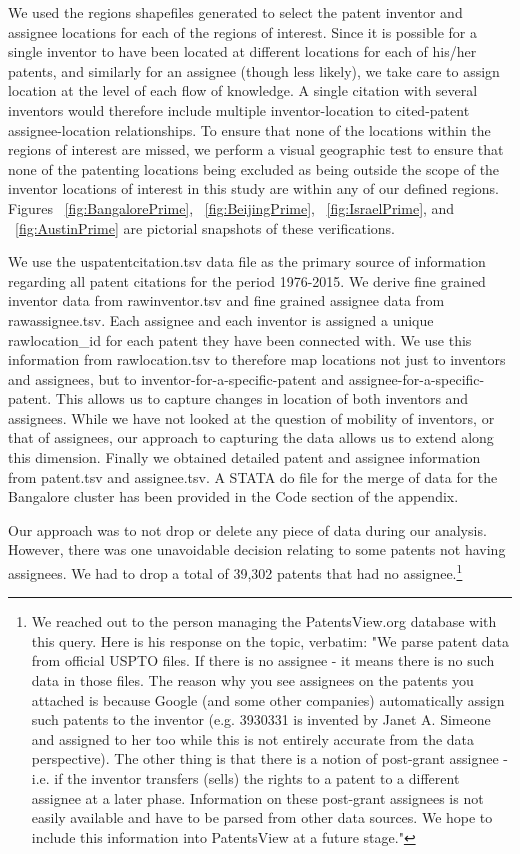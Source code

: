\documentclass[12pt]{article}
\begin{document}
We used the regions shapefiles generated to select the patent inventor and assignee locations for each of the regions of interest. Since it is possible for a single inventor to have been located at different locations for each of his/her patents, and similarly for an assignee (though less likely), we take care to assign location at the level of each flow of knowledge. A single citation with several inventors would therefore include multiple inventor-location to cited-patent assignee-location relationships. To ensure that none of the locations within the regions of interest are missed, we perform a visual geographic test to ensure that none of the patenting locations being excluded as being outside the scope of the inventor locations of interest in this study are within any of our defined regions. Figures ~\ref{fig:BangalorePrime}, ~\ref{fig:BeijingPrime}, ~\ref{fig:IsraelPrime}, and ~\ref{fig:AustinPrime} are pictorial snapshots of these verifications.

We use the uspatentcitation.tsv data file as the primary source of information regarding all patent citations for the period 1976-2015. We derive fine grained inventor data from rawinventor.tsv and fine grained assignee data from rawassignee.tsv. Each assignee and each inventor is assigned a unique rawlocation\_id for each patent they have been connected with. We use this information from rawlocation.tsv to therefore map locations not just to inventors and assignees, but to inventor-for-a-specific-patent and assignee-for-a-specific-patent. This allows us to capture changes in location of both inventors and assignees. While we have not looked at the question of mobility of inventors, or that of assignees, our approach to capturing the data allows us to extend along this dimension. Finally we obtained detailed patent and assignee information from patent.tsv and assignee.tsv. A STATA do file for the merge of data for the Bangalore cluster has been provided in the Code section of the appendix. 

Our approach was to not drop or delete any piece of data during our analysis. However, there was one unavoidable decision relating to some patents not having assignees. We had to drop a total of 39,302 patents that had no assignee.\footnote{We reached out to the person managing the PatentsView.org database with this query. Here is his response on the topic, verbatim: "We parse patent data from official USPTO files. If there is no assignee - it means there is no such data in those files. The reason why you see assignees on the patents you attached is because Google (and some other companies) automatically assign such patents to the inventor (e.g. 3930331 is invented by Janet A. Simeone and assigned to her too while this is not entirely accurate from the data perspective). The other thing is that there is a notion of post-grant assignee - i.e. if the inventor transfers (sells) the rights to a patent to a different assignee at a later phase. Information on these post-grant assignees is not easily available and have to be parsed from other data sources. We hope to include this information into PatentsView at a future stage."}
\end{document}
